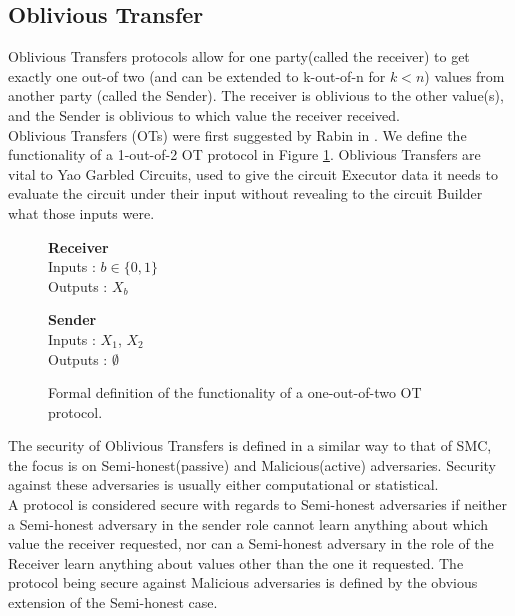 \documentclass[a4paper,11pt]{article}
\begin{document}
		\subsection{Oblivious Transfer} \label{sec:OT_Intro}
			Oblivious Transfers protocols allow for one party(called the receiver) to get exactly one out-of two (and can be extended to k-out-of-n for $k < n$) values from another party (called the Sender). The receiver is oblivious to the other value(s), and the Sender is oblivious to which value the receiver received.\\

			Oblivious Transfers (OTs) were first suggested by Rabin in \cite{Rabin81}. We define the functionality of a 1-out-of-2 OT protocol in Figure \ref{fig:OTformalDef}. Oblivious Transfers are vital to Yao Garbled Circuits, used to give the circuit Executor data it needs to evaluate the circuit under their input without revealing to the circuit Builder what those inputs were.\\

			\begin{figure}[!htb]
				\centering
				\begin{minipage}{0.45\textwidth}
					\centering
					\textbf{Receiver}\\
					Inputs : $b \in \{0, 1\}$\\
					Outputs : $X_b$\\
				\end{minipage}
				\begin{minipage}{0.45\textwidth}
					\centering
					\textbf{Sender}\\
					Inputs : $X_1$, $X_2$\\
					Outputs : $\emptyset$\\
				\end{minipage}

				\caption{ Formal definition of the functionality of a one-out-of-two OT protocol.\label{fig:OTformalDef}}
			\end{figure}
  
			The security of Oblivious Transfers is defined in a similar way to that of SMC, the focus is on Semi-honest(passive) and Malicious(active) adversaries. Security against these adversaries is usually either computational or statistical.\\

			A protocol is considered secure with regards to Semi-honest adversaries if neither a Semi-honest adversary in the sender role cannot learn anything about which value the receiver requested, nor can a Semi-honest adversary in the role of the Receiver learn anything about values other than the one it requested. The protocol being secure against Malicious adversaries is defined by the obvious extension of the Semi-honest case.\\
\end{document}
